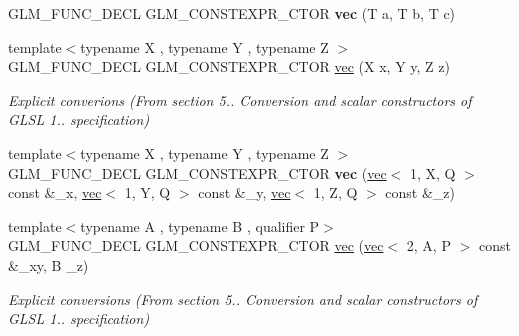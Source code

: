 \begin{DoxyCompactItemize}
G\+L\+M\+\_\+\+F\+U\+N\+C\+\_\+\+D\+E\+CL G\+L\+M\+\_\+\+C\+O\+N\+S\+T\+E\+X\+P\+R\+\_\+\+C\+T\+OR {\bfseries vec} (T a, T b, T c)
\item 
\mbox{\label{structglm_1_1vec_3_013_00_01T_00_01Q_01_4_a9d9e0c35f6991046e1f8f68088dc0f9a}} 
{\footnotesize template$<$typename X , typename Y , typename Z $>$ }\\G\+L\+M\+\_\+\+F\+U\+N\+C\+\_\+\+D\+E\+CL G\+L\+M\+\_\+\+C\+O\+N\+S\+T\+E\+X\+P\+R\+\_\+\+C\+T\+OR \hyperlink{structglm_1_1vec_3_013_00_01T_00_01Q_01_4_a9d9e0c35f6991046e1f8f68088dc0f9a}{vec} (X x, Y y, Z z)
\begin{DoxyCompactList}\small\item\em Explicit converions (From section 5.. Conversion and scalar constructors of G\+L\+SL 1.. specification) \end{DoxyCompactList}\item 
\mbox{\label{structglm_1_1vec_3_013_00_01T_00_01Q_01_4_a9aa0a92a8278c84bf0fd3090cbc414d6}} 
{\footnotesize template$<$typename X , typename Y , typename Z $>$ }\\G\+L\+M\+\_\+\+F\+U\+N\+C\+\_\+\+D\+E\+CL G\+L\+M\+\_\+\+C\+O\+N\+S\+T\+E\+X\+P\+R\+\_\+\+C\+T\+OR {\bfseries vec} (\hyperlink{structglm_1_1vec}{vec}$<$ 1, X, Q $>$ const \&\+\_\+x, \hyperlink{structglm_1_1vec}{vec}$<$ 1, Y, Q $>$ const \&\+\_\+y, \hyperlink{structglm_1_1vec}{vec}$<$ 1, Z, Q $>$ const \&\+\_\+z)
\item 
\mbox{\label{structglm_1_1vec_3_013_00_01T_00_01Q_01_4_a7c657ca44f6029476baa5ad38c8e6220}} 
{\footnotesize template$<$typename A , typename B , qualifier P$>$ }\\G\+L\+M\+\_\+\+F\+U\+N\+C\+\_\+\+D\+E\+CL G\+L\+M\+\_\+\+C\+O\+N\+S\+T\+E\+X\+P\+R\+\_\+\+C\+T\+OR \hyperlink{structglm_1_1vec_3_013_00_01T_00_01Q_01_4_a7c657ca44f6029476baa5ad38c8e6220}{vec} (\hyperlink{structglm_1_1vec}{vec}$<$ 2, A, P $>$ const \&\+\_\+xy, B \+\_\+z)
\begin{DoxyCompactList}\small\item\em Explicit conversions (From section 5.. Conversion and scalar constructors of G\+L\+SL 1.. specification) \end{DoxyCompactList}\item 
\mbox{\label{structglm_1_1vec_3_013_00_01T_00_01Q_01_4_a800af9ada84dfb76714e279e81eb266e}} 

\end{DoxyCompactItemize}
